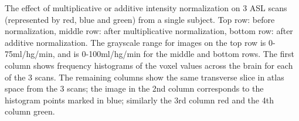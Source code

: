 \label{fig:rgb_figure} The effect of multiplicative or additive intensity normalization on 3 ASL scans (represented by red, blue and green) from a single subject. Top row: before normalization, middle row: after multiplicative normalization, bottom row: after additive normalization. The grayscale range for images on the top row is 0-75ml/hg/min, and is 0-100ml/hg/min for the middle and bottom rows. The first column shows frequency histograms of the voxel values across the brain for each of the 3 scans. The remaining columns show the same transverse slice in atlas space from the 3 scans; the image in the 2nd column corresponds to the histogram points marked in blue; similarly the 3rd column red and the 4th column green. 
